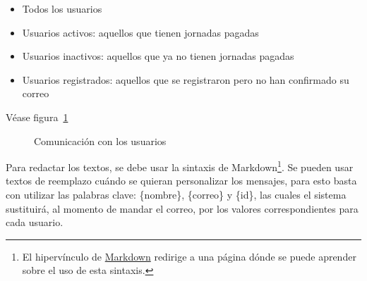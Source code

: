 \begin{itemize}
	\item Todos los usuarios
	\item Usuarios activos: aquellos que tienen jornadas pagadas
	\item Usuarios inactivos: aquellos que ya no tienen jornadas pagadas
	\item Usuarios registrados: aquellos que se registraron pero no han confirmado su correo
\end{itemize}
Véase figura~\ref{Fig:correos}

\begin{figure}[!htb]\centering
   \begin {minipage}{0.8\textwidth}
     \caption{Comunicación con los usuarios}
	 \label{Fig:correos}
   \end{minipage}
\end{figure}

Para redactar los textos, se debe usar la sintaxis de Markdown\footnote{El hipervínculo de \underline{Markdown} redirige a una página dónde se puede aprender sobre el uso de esta sintaxis.}.
Se pueden usar textos de reemplazo cuándo se quieran personalizar los mensajes, para esto basta con utilizar las palabras clave: \{nombre\}, \{correo\} y \{id\}, las cuales el sistema sustituirá, al momento de mandar el correo, por los valores correspondientes para cada usuario.





